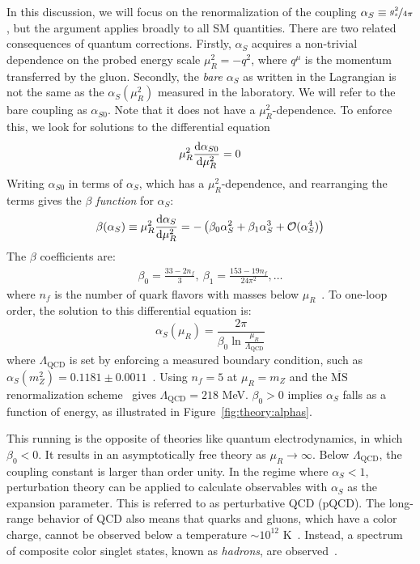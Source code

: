 In this discussion, we will focus on the renormalization of the coupling ${\alpha_S \equiv \nicefrac{g_s^2}{4\pi}}$, but the argument applies broadly to all SM quantities.
There are two related consequences of quantum corrections.
Firstly, ${\alpha_S}$ acquires a non-trivial dependence on the probed energy scale ${\mu_R^2 = -q^2}$, where ${q^\mu}$ is the momentum transferred by the gluon.
Secondly, the \emph{bare} ${\alpha_S}$ as written in the Lagrangian is not the same as the ${\alpha_S(\mu_R^2)}$ measured in the laboratory.
We will refer to the bare coupling as ${\alpha_{S0}}$. 
Note that it does not have a ${\mu_R^2}$-dependence.
To enforce this, we look for solutions to the differential equation
\begin{equation}
    \mu_R^2 \frac{\mathrm{d} \alpha_{S0}}{\mathrm{d}\mu_R^2} = 0
\end{equation}
Writing ${\alpha_{S0}}$ in terms of ${\alpha_S}$, which has a ${\mu_R^2}$-dependence, and rearranging the terms gives the \emph{${\beta}$ function} for ${\alpha_S}$:
\begin{equation}
    \beta(\alpha_S) \equiv \mu_R^2 \frac{\mathrm{d} \alpha_S}{\mathrm{d}\mu_R^2} = -\left(\beta_0 \alpha_S^2 + \beta_1 \alpha_S^3 + \mathcal{O}(\alpha_S^4)\right)
\end{equation}
The ${\beta}$ coefficients are:
\begin{align}
    \beta_0 = \frac{33 - 2n_{f}}{3},~ 
    \beta_1 = \frac{153-19n_f}{24\pi^2} ,\dots
\end{align}
where ${n_f}$ is the number of quark flavors with masses below ${\mu_R}$~\cite{pdg,qcd1,qcd2,qcd3}.
To one-loop order, the solution to this differential equation is:
\begin{equation}
    \alpha_S(\mu_R) = \frac{2\pi}{\beta_0 \ln \frac{\mu_R}{\Lambda_\mathrm{QCD}}}
\end{equation}
where ${\Lambda_\mathrm{QCD}}$ is set by enforcing a measured boundary condition, such as $\alpha_S(m_Z^2) = 0.1181 \pm 0.0011$~\cite{pdg}.
Using ${n_f=5}$ at ${\mu_R = m_Z}$ and the ${\overline{\text{MS}}}$ renormalization scheme~\cite{msbar} gives ${\Lambda_\mathrm{QCD} = 218}$ MeV.
${\beta_0>0}$ implies ${\alpha_S}$ falls as a function of energy, as illustrated in Figure~\ref{fig:theory:alphas}.

This running is the opposite of theories like quantum electrodynamics, in which ${\beta_0<0}$.
It results in an asymptotically free theory as ${\mu_R\rightarrow \infty}$.
Below ${\Lambda_\mathrm{QCD}}$, the coupling constant is larger than order unity.
In the regime where ${\alpha_S < 1}$, perturbation theory can be applied to calculate observables with ${\alpha_S}$ as the expansion parameter.
This is referred to as perturbative QCD (pQCD).
The long-range behavior of QCD also means that quarks and gluons, which have a color charge, cannot be observed below a temperature ${\sim 10^{12}}$ K~\cite{hagedorn}.
Instead, a spectrum of composite color singlet states, known as \emph{hadrons}, are observed~\cite{quarkmodel}.

